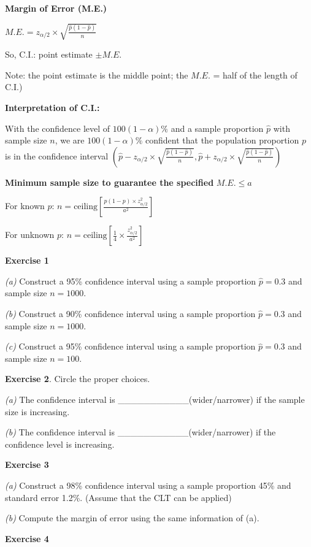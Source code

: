 \documentclass[
]{book}
\begin{document}
\textbf{Margin of Error (M.E.)}

\(M.E. = z_{\alpha/2} \times \sqrt{\frac{\hat{p}(1-\hat{p})}{n}}\)

So, C.I.: point estimate \(\pm M.E.\)

Note: the point estimate is the middle point; the \(M.E.\) = half of the length of C.I.)

\textbf{Interpretation of C.I.:}

With the confidence level of \(100(1-\alpha)\%\) and a sample proportion \(\hat{p}\) with sample size \(n\), we are \(100(1-\alpha)\%\) confident that the population proportion \(p\) is in the confidence interval \((\hat{p} - z_{\alpha/2} \times \sqrt{\frac{\hat{p}(1-\hat{p})}{n}}, \hat{p} + z_{\alpha/2} \times \sqrt{\frac{\hat{p}(1-\hat{p})}{n}})\)

\textbf{Minimum sample size to guarantee the specified} \(M.E. \leq a\)

For known \(p\): \(n = \text{ceiling} \left[ \frac{p(1-p) \times z_{\alpha/2}^2}{a^2} \right]\)

For unknown \(p\): \(n = \text{ceiling} \left[ \frac{1}{4} \times \frac{z_{\alpha/2}^2}{a^2} \right]\)

\textbf{Exercise 1}

\emph{(a)} Construct a 95\% confidence interval using a sample proportion \(\hat{p} = 0.3\) and sample size \(n=1000\).

\emph{(b)} Construct a 90\% confidence interval using a sample proportion \(\hat{p} = 0.3\) and sample size \(n=1000\).

\emph{(c)} Construct a 95\% confidence interval using a sample proportion \(\hat{p} = 0.3\) and sample size \(n=100\).

\textbf{Exercise 2}. Circle the proper choices.

\emph{(a)} The confidence interval is \_\_\_\_\_\_\_\_\_\_\_(wider/narrower) if the sample size is increasing.

\emph{(b)} The confidence interval is \_\_\_\_\_\_\_\_\_\_\_(wider/narrower) if the confidence level is increasing.

\textbf{Exercise 3}

\emph{(a)} Construct a 98\% confidence interval using a sample proportion 45\% and standard error 1.2\%. (Assume that the CLT can be applied)

\emph{(b)} Compute the margin of error using the same information of (a).

\textbf{Exercise 4}
\end{document}
